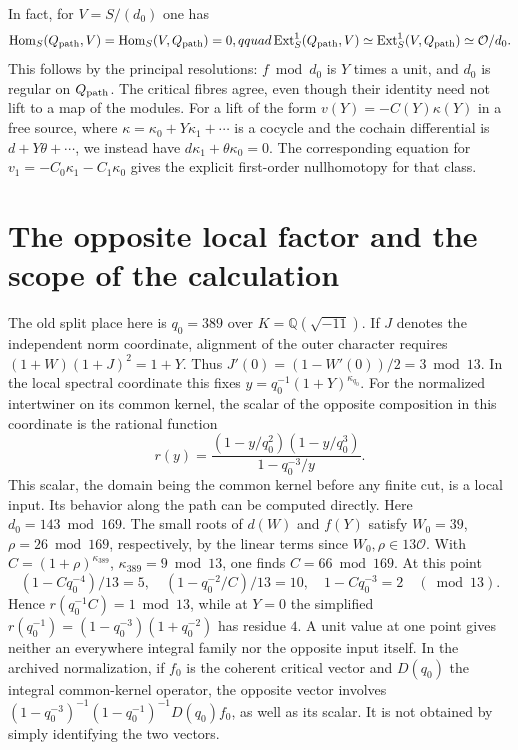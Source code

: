 \documentclass[11pt]{article}
\newcommand{\Q}{\mathbb Q}
\newcommand{\OO}{\mathcal O}
\begin{document}
In fact, for $V=S/(d_0)$ one has
\[
 \mathrm{Hom}_S(Q_{\rm path},V)=\mathrm{Hom}_S(V,Q_{\rm path})=0,qquad
 \operatorname{Ext}^1_S(Q_{\rm path},V)\simeq
 \operatorname{Ext}^1_S(V,Q_{\rm path})\simeq\OO/d_0.
\]
This follows by the principal resolutions: $f\bmod d_0$ is $Y$ times
a unit, and $d_0$ is regular on $Q_{\rm path}$. The critical fibres
agree, even though their identity need not lift to a map of the modules.
For a lift of the form $v(Y)=-C(Y)\kappa(Y)$ in a free source,
where $\kappa=\kappa_0+Y\kappa_1+\cdots$ is a cocycle and the
cochain differential is $d+Y\theta+\cdots$, we instead have
$d\kappa_1+\theta\kappa_0=0$. The corresponding equation for
$v_1=-C_0\kappa_1-C_1\kappa_0$ gives the explicit first-order
nullhomotopy for that class.

\section{The opposite local factor and the scope of the calculation}
The old split place here is $q_0=389$ over $K=\Q(\sqrt{-11})$.
If $J$ denotes the independent norm coordinate, alignment of the
outer character requires $(1+W)(1+J)^2=1+Y$. Thus
$J'(0)=(1-W'(0))/2=3\bmod13$. In the local spectral coordinate this
fixes $y=q_0^{-1}(1+Y)^{\kappa_{q_0}}$. For the normalized
intertwiner on its common kernel, the scalar of the opposite
composition in this coordinate is the rational function
\[
 r(y)=\frac{(1-y/q_0^2)(1-y/q_0^3)}{1-q_0^{-3}/y}.
\]
This scalar, the domain being the common kernel before any finite cut,
is a local input. Its behavior along the path can be computed directly.
Here $d_0=143\bmod169$. The small roots of $d(W)$ and $f(Y)$
satisfy $W_0=39$, $\rho=26\bmod169$, respectively, by the linear
terms since $W_0,\rho\in13\OO$. With $C=(1+\rho)^{\kappa_{389}}$,
$\kappa_{389}=9\bmod13$, one finds $C=66\bmod169$. At this point
\[
 (1-Cq_0^{-4})/13=5,\quad (1-q_0^{-2}/C)/13=10,\quad
 1-Cq_0^{-3}=2\quad(\bmod 13).
\]
Hence $r(q_0^{-1}C)=1\bmod13$, while at $Y=0$ the simplified
$r(q_0^{-1})=(1-q_0^{-3})(1+q_0^{-2})$ has residue $4$.
A unit value at one point gives neither an everywhere integral family
nor the opposite input itself. In the archived normalization, if $f_0$
is the coherent critical vector and $D(q_0)$ the integral common-kernel
operator, the opposite vector involves
$(1-q_0^{-3})^{-1}(1-q_0^{-1})^{-1}D(q_0)f_0$, as well as its scalar.
It is not obtained by simply identifying the two vectors.
\end{document}
